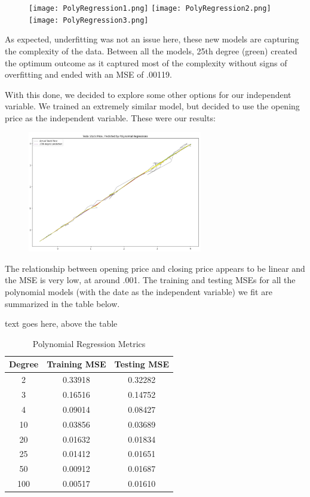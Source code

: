 \documentclass[12pt,a4paper]{article}
\begin{document}
\begin{figure}[h]
\centering
\texttt{[image: PolyRegression1.png]}
\texttt{[image: PolyRegression2.png]}
\texttt{[image: PolyRegression3.png]}
\end{figure}

As expected, underfitting was not an issue here, these new models are capturing the complexity of the data. Between all the models, 25th degree (green) created the optimum outcome as it captured most of the complexity without signs of overfitting and ended with an MSE of .00119.

With this done, we decided to explore some other options for our independent variable. We trained an extremely similar model, but decided to use the opening price as the independent variable. These were our results:

\begin{figure}[h]
\centering
\includegraphics[width=3in]{./Figures/PolyRegression4.png}
\end{figure}

The relationship between opening price and closing price appears to be linear and the MSE is very low, at around .001. The training and testing MSEs for all the polynomial models (with the date as the independent variable) we fit are summarized in the table below.

text goes here, above the table

\begin{table}[h]
\caption{Polynomial Regression Metrics}
\centering
\begin{tabular}{ccc}
\hline
\hline
Degree & Training MSE & Testing MSE \\ \hline
2      & 0.33918      & 0.32282     \\
3      & 0.16516      & 0.14752     \\
4      & 0.09014      & 0.08427     \\
10     & 0.03856      & 0.03689     \\
20     & 0.01632      & 0.01834     \\
25     & 0.01412      & 0.01651     \\
50     & 0.00912      & 0.01687     \\
100    & 0.00517      & 0.01610     \\ \hline
\hline
\end{tabular}
\end{table}
\end{document}
